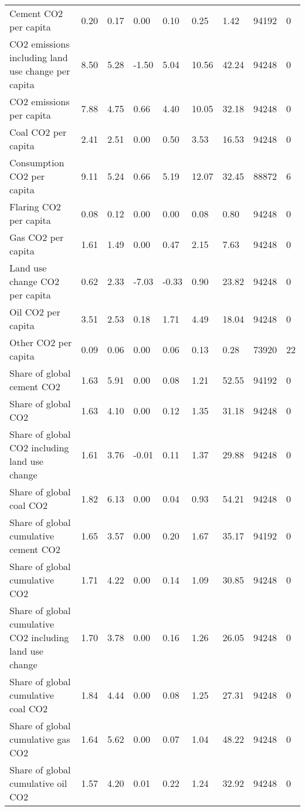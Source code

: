 \begin{longtable}{lllllllll}
Cement CO2 per capita & 0.20 & 0.17 & 0.00 & 0.10 & 0.25 & 1.42 & 94192 & 0\\
CO2 emissions including land use change per capita & 8.50 & 5.28 & -1.50 & 5.04 & 10.56 & 42.24 & 94248 & 0\\
CO2 emissions per capita & 7.88 & 4.75 & 0.66 & 4.40 & 10.05 & 32.18 & 94248 & 0\\
Coal CO2 per capita & 2.41 & 2.51 & 0.00 & 0.50 & 3.53 & 16.53 & 94248 & 0\\
\addlinespace
Consumption CO2 per capita & 9.11 & 5.24 & 0.66 & 5.19 & 12.07 & 32.45 & 88872 & 6\\
Flaring CO2 per capita & 0.08 & 0.12 & 0.00 & 0.00 & 0.08 & 0.80 & 94248 & 0\\
Gas CO2 per capita & 1.61 & 1.49 & 0.00 & 0.47 & 2.15 & 7.63 & 94248 & 0\\
Land use change CO2 per capita & 0.62 & 2.33 & -7.03 & -0.33 & 0.90 & 23.82 & 94248 & 0\\
Oil CO2 per capita & 3.51 & 2.53 & 0.18 & 1.71 & 4.49 & 18.04 & 94248 & 0\\
\addlinespace
Other CO2 per capita & 0.09 & 0.06 & 0.00 & 0.06 & 0.13 & 0.28 & 73920 & 22\\
Share of global cement CO2 & 1.63 & 5.91 & 0.00 & 0.08 & 1.21 & 52.55 & 94192 & 0\\
Share of global CO2 & 1.63 & 4.10 & 0.00 & 0.12 & 1.35 & 31.18 & 94248 & 0\\
Share of global CO2 including land use change & 1.61 & 3.76 & -0.01 & 0.11 & 1.37 & 29.88 & 94248 & 0\\
Share of global coal CO2 & 1.82 & 6.13 & 0.00 & 0.04 & 0.93 & 54.21 & 94248 & 0\\
\addlinespace
Share of global cumulative cement CO2 & 1.65 & 3.57 & 0.00 & 0.20 & 1.67 & 35.17 & 94192 & 0\\
Share of global cumulative CO2 & 1.71 & 4.22 & 0.00 & 0.14 & 1.09 & 30.85 & 94248 & 0\\
Share of global cumulative CO2 including land use change & 1.70 & 3.78 & 0.00 & 0.16 & 1.26 & 26.05 & 94248 & 0\\
Share of global cumulative coal CO2 & 1.84 & 4.44 & 0.00 & 0.08 & 1.25 & 27.31 & 94248 & 0\\
Share of global cumulative gas CO2 & 1.64 & 5.62 & 0.00 & 0.07 & 1.04 & 48.22 & 94248 & 0\\
\addlinespace
Share of global cumulative oil CO2 & 1.57 & 4.20 & 0.01 & 0.22 & 1.24 & 32.92 & 94248 & 0\\

\end{longtable}
